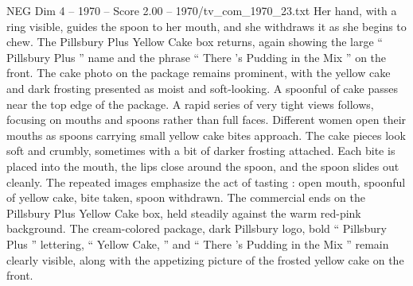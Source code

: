 \begin{textsample}{NEG Dim 4 – 1970 – Score 2.00 – 1970/tv\_com\_1970\_23.txt}
Her hand, with a ring visible, guides the spoon to her mouth, and she withdraws it as she begins to chew.
The Pillsbury Plus Yellow Cake box returns, again showing the large “ Pillsbury Plus ” name and the phrase “ There ’s Pudding in the Mix ” on the front.
The cake photo on the package remains prominent, with the yellow cake and dark frosting presented as moist and soft-looking.
A spoonful of cake passes near the top edge of the package.
A rapid series of very tight views follows, focusing on mouths and spoons rather than full faces.
Different women open their mouths as spoons carrying small yellow cake bites approach.
The cake pieces look soft and crumbly, sometimes with a bit of darker frosting attached.
Each bite is placed into the mouth, the lips close around the spoon, and the spoon slides out cleanly.
The repeated images emphasize the act of tasting : open mouth, spoonful of yellow cake, bite taken, spoon withdrawn.
The commercial ends on the Pillsbury Plus Yellow Cake box, held steadily against the warm red-pink background.
The cream-colored package, dark Pillsbury logo, bold “ Pillsbury Plus ” lettering, “ Yellow Cake, ” and “ There ’s Pudding in the Mix ” remain clearly visible, along with the appetizing picture of the frosted yellow cake on the front.

\end{textsample}

